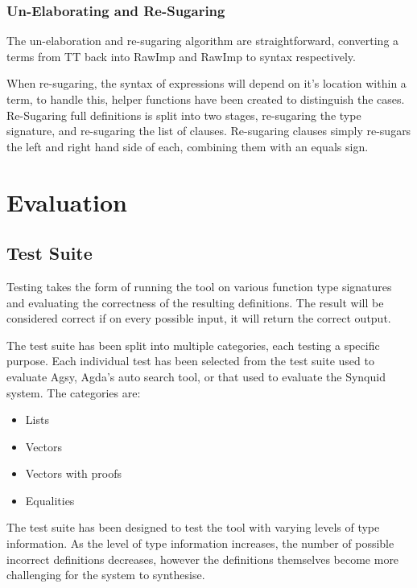 \documentclass[a4paper]{article}
\begin{document}
\subsubsection{Un-Elaborating and Re-Sugaring}

The un-elaboration and re-sugaring algorithm are straightforward,
converting a terms from TT back into RawImp and RawImp to syntax respectively.

When re-sugaring, the syntax of expressions will depend on it's location within a term,
to handle this, helper functions have been created to distinguish the cases.
Re-Sugaring full definitions is split into two stages, re-sugaring the type
signature, and re-sugaring the list of clauses. Re-sugaring clauses simply re-sugars the
left and right hand side of each, combining them with an equals sign.

\clearpage

\section{Evaluation}
\label{sec:org2fc5750}

\subsection{Test Suite}

Testing takes the form of running the tool on various
function type signatures and evaluating the correctness
of the resulting definitions. The result
will be considered correct if on every possible input, it
will return the correct output. 

The test suite has been split into multiple categories, 
each testing a specific purpose. Each individual test 
has been selected from the test suite used to evaluate 
Agsy, Agda's auto search tool, or that used to evaluate the Synquid system.
The categories are: 

\begin{itemize}
\item Lists
\item Vectors
\item Vectors with proofs
\item Equalities
\end{itemize}

The test suite has been designed to test the tool with varying
levels of type information. As the level of type information
increases, the number of possible incorrect definitions decreases,
however the definitions themselves become more challenging for the
system to synthesise.
\end{document}
